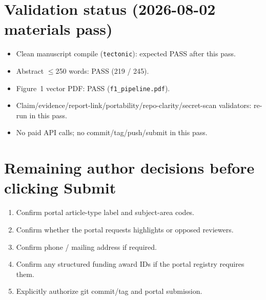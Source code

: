 \documentclass[10pt]{article}
\begin{document}
\section*{Validation status (2026-08-02 materials pass)}
\begin{itemize}[leftmargin=1.4em,itemsep=0.25em]
  \item Clean manuscript compile (\texttt{tectonic}): expected PASS after this pass.
  \item Abstract $\le$250 words: PASS (219 / 245).
  \item Figure~1 vector PDF: PASS (\texttt{f1\_pipeline.pdf}).
  \item Claim/evidence/report-link/portability/repo-clarity/secret-scan validators: re-run in this pass.
  \item No paid API calls; no commit/tag/push/submit in this pass.
\end{itemize}

\section*{Remaining author decisions before clicking Submit}
\begin{enumerate}[leftmargin=1.4em,itemsep=0.25em]
  \item Confirm portal article-type label and subject-area codes.
  \item Confirm whether the portal requests highlights or opposed reviewers.
  \item Confirm phone / mailing address if required.
  \item Confirm any structured funding award IDs if the portal registry requires them.
  \item Explicitly authorize git commit/tag and portal submission.
\end{enumerate}
\end{document}
